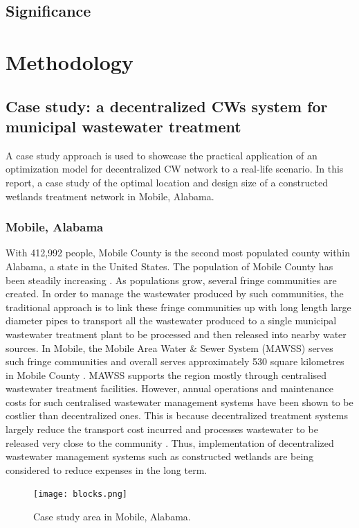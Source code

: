 \documentclass[preprint,12pt,authoryear]{elsarticle}
\begin{document}
\subsection{Significance}

\section{Methodology}\label{section:method}
\subsection{Case study: a decentralized CWs system for municipal wastewater treatment}
A case study approach is used to showcase the practical application of an optimization model for decentralized CW network to a real-life scenario. In this report, a case study of the optimal location and design size of a constructed wetlands treatment network in Mobile, Alabama.

\subsubsection{Mobile, Alabama}
With 412,992 people, Mobile County is the second most populated county within Alabama, a state in the United States. The population of Mobile County has been steadily increasing \citep{uscb2002census}. As populations grow, several fringe communities are created. In order to manage the wastewater produced by such communities, the traditional approach is to link these fringe communities up with long length large diameter pipes to transport all the wastewater produced to a single municipal wastewater treatment plant to be processed and then released into nearby water sources. In Mobile, the Mobile Area Water \& Sewer System (MAWSS) serves such fringe communities and overall serves approximately 530 square kilometres in Mobile County \citep{mawss2015}. MAWSS supports the region mostly through centralised wastewater treatment facilities. However, annual operations and maintenance costs for such centralised wastewater management systems have been shown to be costlier than decentralized ones. This is because decentralized treatment systems largely reduce the transport cost incurred and processes wastewater to be released very close to the community \citep{mawss2015}. Thus, implementation of decentralized wastewater management systems such as constructed wetlands are being considered to reduce expenses in the long term. 

\begin{figure}%
	\centering
	\texttt{[image: blocks.png]}
	\caption{Case study area in Mobile, Alabama.}
	\label{fig:blocks}
\end{figure}
\end{document}
